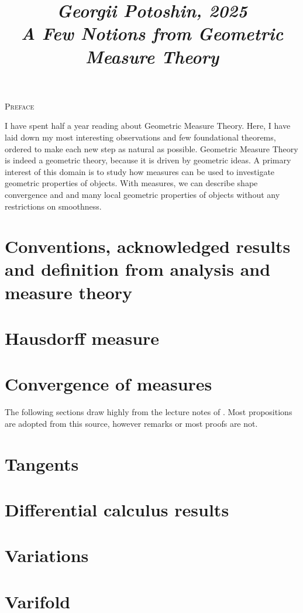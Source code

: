 \documentclass{article}
\begin{document}
\title{
\vspace{-1cm}
\textit{\small{Georgii Potoshin, 2025}}\\
\vspace{0.3ex}
\textit{\huge{A Few Notions from Geometric Measure Theory}}\vspace{1ex}
}
\date{\vspace{-5ex}}
\maketitle

\begin{center}\textsc{\Large{Preface}}\end{center}

I have spent half a year reading about Geometric Measure Theory. Here, I have
laid  down my most interesting observations and few foundational theorems,
ordered to make each new step as natural as possible.
Geometric Measure Theory is indeed a geometric theory, because it is
driven by geometric ideas. A primary interest of this domain is to study how
measures can be used to investigate geometric properties of objects. With measures,
we can describe shape convergence and and many local geometric properties
of objects without any restrictions on smoothness.

\section{Conventions, acknowledged results and definition from analysis and measure theory}


\section{Hausdorff measure}


\section{Convergence of measures}


\vspace{1ex}
The following sections draw highly from the lecture notes of \cite{giovanni_alberti}.
Most propositions are adopted from this source, however remarks or most proofs
are not.

\section{Tangents}


\section{Differential calculus results}


\section{Variations}


\section{Varifold}


\medskip


\end{document}
